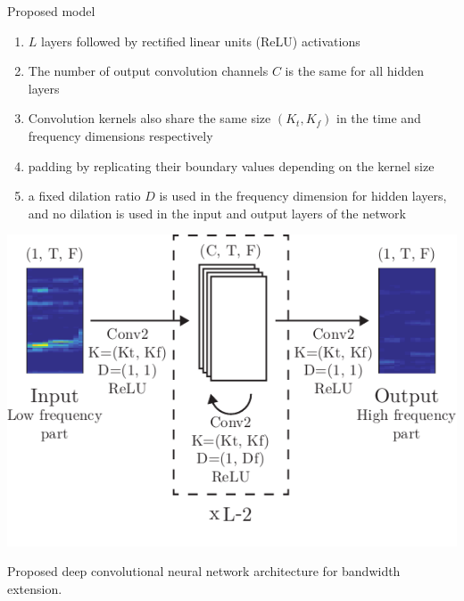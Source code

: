 \documentclass[compress]{beamer}
\begin{document}
\begin{frame}{Proposed model}
  \begin{minipage}[c]{.5\linewidth}
  \begin{enumerate}
    \item $L$ layers followed by rectified linear units (ReLU) activations
    \item The number of output convolution channels $C$ is the same for all hidden layers
     \item Convolution kernels also share the same size $(K_t, K_f)$ in the time and frequency dimensions respectively
     \item padding by replicating their boundary values depending on the kernel size
     \item a fixed dilation ratio $D$ is used in the frequency dimension for hidden layers, and no dilation is used in the input and output layers of the network
  \end{enumerate}
  \end{minipage}
  \begin{minipage}[c]{.5\linewidth}
    \hspace{2cm}\begin{center}

    \includegraphics[width=.9\linewidth]{mdl}

Proposed deep convolutional neural network architecture for bandwidth extension.
\end{center}
  \end{minipage}
\end{frame}
\end{document}
